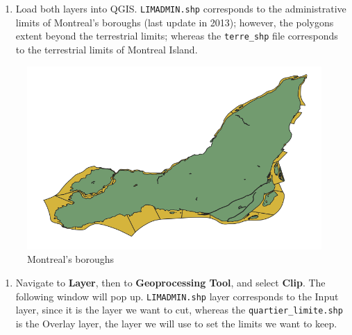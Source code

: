 \documentclass[]{book}
\providecommand{\tightlist}{%
  \setlength{\itemsep}{0pt}\setlength{\parskip}{0pt}}
\theoremstyle{definition}
\theoremstyle{definition}
\theoremstyle{definition}
\theoremstyle{remark}
\begin{document}
\begin{enumerate}
\def\labelenumi{\arabic{enumi}.}
\tightlist
\item
  Load both layers into QGIS. \texttt{LIMADMIN.shp} corresponds to the
  administrative limits of Montreal's boroughs (last update in 2013);
  however, the polygons extent beyond the terrestrial limits; whereas
  the \texttt{terre\_shp} file corresponds to the terrestrial limits of
  Montreal Island.
\end{enumerate}

\begin{figure}

{\centering \includegraphics[width=10.25in]{figures/Clipping_Vectors} 

}

\caption{Montreal’s boroughs}\label{fig:unnamed-chunk-19}
\end{figure}

\begin{enumerate}
\def\labelenumi{\arabic{enumi}.}
\setcounter{enumi}{1}
\tightlist
\item
  Navigate to \textbf{Layer}, then to \textbf{Geoprocessing Tool}, and
  select \textbf{Clip}. The following window will pop up.
  \texttt{LIMADMIN.shp} layer corresponds to the Input layer, since it
  is the layer we want to cut, whereas the \texttt{quartier\_limite.shp}
  is the Overlay layer, the layer we will use to set the limits we want
  to keep.
\end{enumerate}
\end{document}
